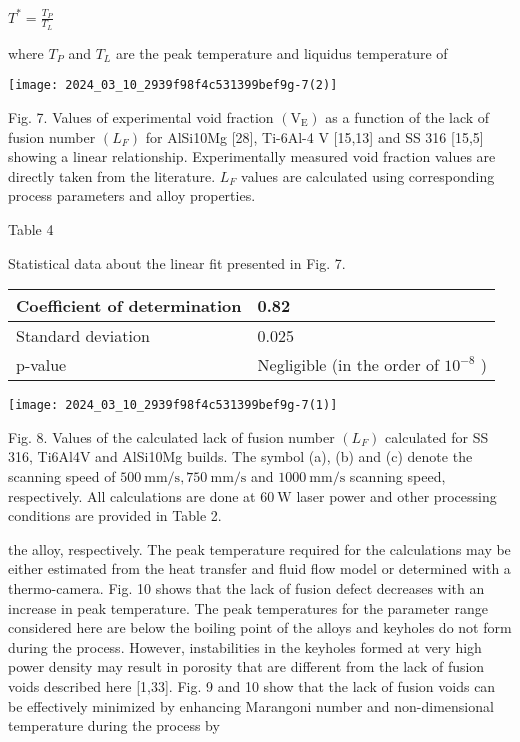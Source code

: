 \documentclass[10pt]{article}
\begin{document}
$T^{*}=\frac{T_{P}}{T_{L}}$

where $T_{P}$ and $T_{L}$ are the peak temperature and liquidus temperature of

\begin{center}
\texttt{[image: 2024\_03\_10\_2939f98f4c531399bef9g-7(2)]}
\end{center}

Fig. 7. Values of experimental void fraction $\left(\mathrm{V}_{\mathrm{E}}\right)$ as a function of the lack of fusion number $\left(L_{F}\right)$ for AlSi10Mg [28], Ti-6Al-4 V [15,13] and SS 316 [15,5] showing a linear relationship. Experimentally measured void fraction values are directly taken from the literature. $L_{F}$ values are calculated using corresponding process parameters and alloy properties.

Table 4

Statistical data about the linear fit presented in Fig. 7.

\begin{center}
\begin{tabular}{ll}
\hline
Coefficient of determination & 0.82 \\
\hline
Standard deviation & 0.025 \\
p-value & Negligible (in the order of $10^{-8}$ ) \\
\hline
\end{tabular}
\end{center}

\begin{center}
\texttt{[image: 2024\_03\_10\_2939f98f4c531399bef9g-7(1)]}
\end{center}

Fig. 8. Values of the calculated lack of fusion number $\left(L_{F}\right)$ calculated for SS 316, Ti6Al4V and AlSi10Mg builds. The symbol (a), (b) and (c) denote the scanning speed of $500 \mathrm{~mm} / \mathrm{s}, 750 \mathrm{~mm} / \mathrm{s}$ and $1000 \mathrm{~mm} / \mathrm{s}$ scanning speed, respectively. All calculations are done at $60 \mathrm{~W}$ laser power and other processing conditions are provided in Table 2.

the alloy, respectively. The peak temperature required for the calculations may be either estimated from the heat transfer and fluid flow model or determined with a thermo-camera. Fig. 10 shows that the lack of fusion defect decreases with an increase in peak temperature. The peak temperatures for the parameter range considered here are below the boiling point of the alloys and keyholes do not form during the process. However, instabilities in the keyholes formed at very high power density may result in porosity that are different from the lack of fusion voids described here [1,33]. Fig. 9 and 10 show that the lack of fusion voids can be effectively minimized by enhancing Marangoni number and non-dimensional temperature during the process by
\end{document}
